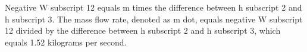 Negative W subscript 12 equals m times the difference between h subscript 2 and h subscript 3. The mass flow rate, denoted as m dot, equals negative W subscript 12 divided by the difference between h subscript 2 and h subscript 3, which equals 1.52 kilograms per second.